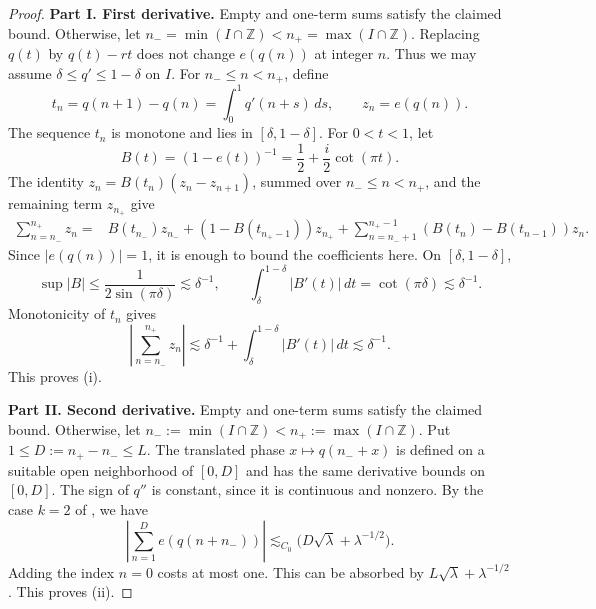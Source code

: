 \documentclass[reqno,12pt]{amsart}
\def \Z {\mathbb Z}
\numberwithin{equation}{section}
\begin{document}
\begin{proof}
	
\medskip	
\noindent\textbf{Part I. First derivative. }
Empty and one-term sums satisfy the claimed bound. Otherwise, let
$n_-=\min(I\cap\Z)<n_+=\max(I\cap \Z)$. Replacing $q(t)$ by $q(t)-rt$ does not
change $e(q(n))$ at integer $n$. Thus we may assume
$\delta\le q'\le1-\delta$ on $I$.
For $n_-\le n<n_+$, define
\[
 t_n=q(n+1)-q(n)=\int_0^1q'(n+s)\,ds,\qquad z_n=e(q(n)).
\]
The sequence $t_n$ is monotone and lies in $[\delta,1-\delta]$.
For $0<t<1$, let
\[
 B(t)=(1-e(t))^{-1}=\frac12+\frac i2\cot(\pi t).
\]
The identity $z_n=B(t_n)(z_n-z_{n+1})$, summed over
$n_-\le n<n_+$, and the remaining term $z_{n_+}$ give
\[
 \begin{split}
 \sum_{n=n_-}^{n_+}z_n={}&B(t_{n_-})z_{n_-}
       +(1-B(t_{n_+-1}))z_{n_+}
 +\sum_{n=n_-+1}^{n_+-1}
       (B(t_n)-B(t_{n-1}))z_n.
 \end{split}
\]
Since $|e(q(n))|=1$, it is enough to bound the coefficients here.
On $[\delta,1-\delta]$,
\[
 \sup|B|\le\frac1{2\sin(\pi\delta)}\lesssim \delta^{-1},
 \qquad
 \int_\delta^{1-\delta}|B'(t)|\,dt
       =\cot(\pi\delta)\lesssim \delta^{-1}.
\]
Monotonicity of $t_n$ gives
$$\left| \sum_{n=n_-}^{n_+}z_n\right|\lesssim \delta^{-1}+\int_\delta^{1-\delta}|B'(t)|\,dt\lesssim \delta^{-1}.$$
This proves (i).

\medskip
\noindent\textbf{Part II. Second derivative.}
Empty and one-term sums satisfy the claimed bound. Otherwise, let
$n_-:=\min(I\cap\Z)<n_+:=\max(I\cap \Z)$. Put $1\le D:=n_+-n_-\le L$.
The translated phase $x\mapsto q(n_-+x)$ is defined on a suitable open
neighborhood of $[0,D]$ and has the same derivative bounds on $[0,D]$.
The sign of $q''$ is constant, since it is continuous and nonzero.
By the case $k=2$ of \cite[Equation~(1)]{HeathBrown2017}, we have 
\[
\left|\sum_{n=1}^{D}e(q(n+n_{-}))\right|
\lesssim_{C_0}\bigl(D\sqrt{\lambda}+\lambda^{-1/2}\bigr).
\]
Adding the index $n=0$ costs at most one. This can be absorbed by
$L\sqrt\lambda+\lambda^{-1/2}$. 
This proves (ii).


\end{proof}
\end{document}
